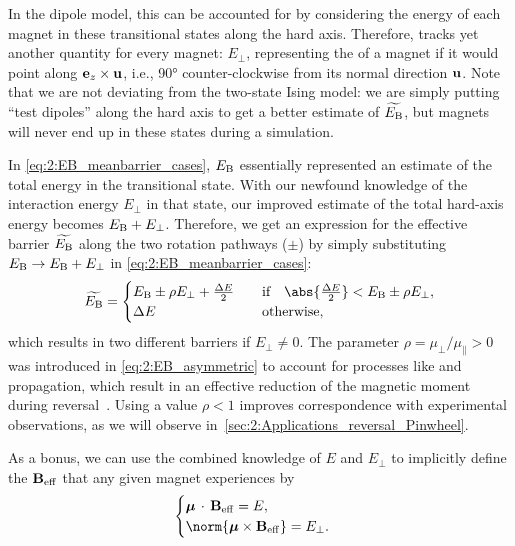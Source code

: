In the dipole model, this can be accounted for by considering the energy of each magnet in these transitional states along the hard axis.
Therefore, \hotspice tracks yet another quantity for every magnet: $E_\perp$, representing the  of a magnet if it would point along $\boldsymbol{\mathbf{e}}_z \times \boldsymbol{\mathbf{u}}$, i.e., \ang{90} counter-clockwise from its normal  direction $\boldsymbol{\mathbf{u}}$.
Note that we are not deviating from the two-state Ising model: we are simply putting ``test dipoles'' along the hard axis to get a better estimate of $\widetilde{E_\mathrm{B}}$, but magnets will never end up in these states during a simulation. \par
In \cref{eq:2:EB_meanbarrier_cases}, $E_\mathrm{B}$ essentially represented an estimate of the total energy in the transitional state.
With our newfound knowledge of the interaction energy $E_\perp$ in that state, our improved estimate of the total hard-axis energy becomes $E_\mathrm{B} + E_\perp$.
Therefore, we get an expression for the effective barrier $\widetilde{E_\mathrm{B}}$ along the two rotation pathways ($\pm$) by simply substituting $E_\mathrm{B} \rightarrow E_\mathrm{B} + E_\perp$ in \cref{eq:2:EB_meanbarrier_cases}:
\begin{equation}
	\label{eq:2:EB_asymmetric}
	\widetilde{E_\mathrm{B}} = \begin{cases}
		E_\mathrm{B} \pm \rho E_\perp + \frac{\Delta E}{2} & \quad \text{if} \quad \abs{\frac{\Delta E}{2}} < E_\mathrm{B} \pm \rho E_\perp, \\
		\Delta E & \quad \text{otherwise}, \\
	\end{cases}
\end{equation}
which results in two different barriers if $E_\perp \neq 0$.
The parameter $\rho = \mu_\perp/\mu_\parallel > 0$ was introduced in \cref{eq:2:EB_asymmetric} to account for  processes like  and propagation, which result in an effective reduction of the magnetic moment during reversal~\cite{leo2021chiral,TimeResolvedDynamicsSOT}.
Using a value $\rho < 1$ improves correspondence with experimental observations, as we will observe in~\cref{sec:2:Applications_reversal_Pinwheel}. \par
As a bonus, we can use the combined knowledge of $E$ and $E_\perp$ to implicitly define the  $\boldsymbol{\mathbf{B}}_\mathrm{eff}$ that any given magnet experiences by
\begin{equation}
	\label{eq:2:B_eff_implicit}
	\begin{cases}
		\vc{\mu} \,\cdot\, \vc{B}_\mathrm{eff} = E \mathrm{,} \\
		\norm{\vc{\mu} \times \vc{B}_\mathrm{eff}} = E_\perp  \mathrm{.}
	\end{cases}
\end{equation}
